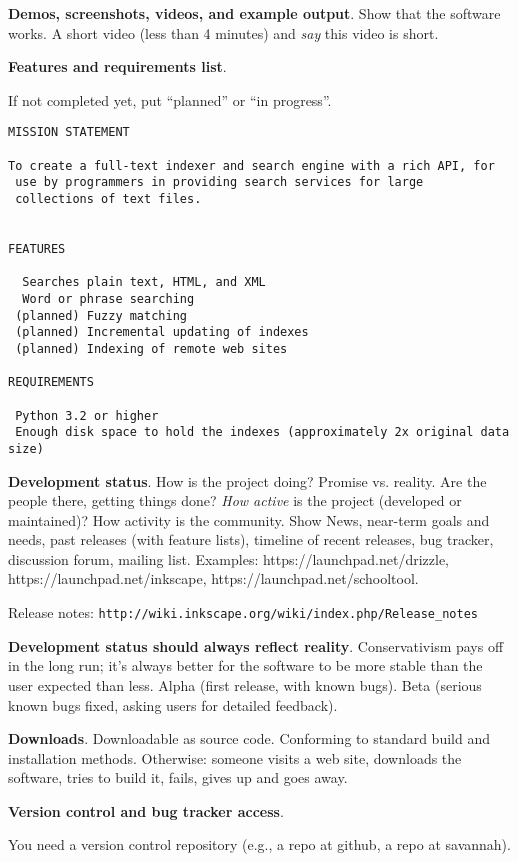 \documentclass[landscape,30pt]{foils}
\begin{document}
{\bf Demos, screenshots, videos, and example output}.  Show that the software works.  A short video (less than 4 minutes) and {\em say} this video is short.

{\bf Features and requirements list}.

If not completed yet, put ``planned'' or ``in progress''.
{\tiny
\begin{verbatim}
MISSION STATEMENT

To create a full-text indexer and search engine with a rich API, for
 use by programmers in providing search services for large
 collections of text files.


FEATURES

  Searches plain text, HTML, and XML
  Word or phrase searching
 (planned) Fuzzy matching
 (planned) Incremental updating of indexes
 (planned) Indexing of remote web sites

REQUIREMENTS

 Python 3.2 or higher
 Enough disk space to hold the indexes (approximately 2x original data size)

\end{verbatim}
}

{\bf Development status}.  How is the project doing?  Promise vs. reality.  Are the people there, getting things done? {\em How active} is the project (developed or maintained)?  How activity is the community.  Show News, near-term goals and needs, past releases (with feature lists), timeline of recent releases, bug tracker, discussion forum, mailing list. Examples: https://launchpad.net/drizzle, https://launchpad.net/inkscape, https://launchpad.net/schooltool.

Release notes:  \texttt{http://wiki.inkscape.org/wiki/index.php/Release\_notes}


{\bf Development status should always reflect reality}.
Conservativism pays off in the long run; it's always better for the
software to be more stable than the user expected than less.  Alpha (first release, with known bugs).  Beta (serious known bugs fixed, asking users for detailed feedback).

{\bf Downloads}.  Downloadable as source code.   Conforming to standard build and installation methods.
Otherwise: someone visits a web site, downloads the software, tries to build it, fails, gives up and goes away.

{\bf Version control and bug tracker access}.

You need a version control repository (e.g., a repo at github, a repo at savannah).
\end{document}
